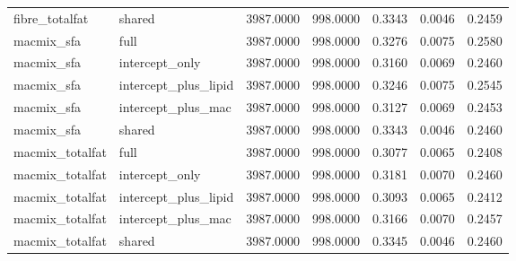 {\begin{longtable}{lllllll}
fibre\_totalfat & shared & 3987.0000 & 998.0000 & 0.3343 & 0.0046 & 0.2459 \\
macmix\_sfa & full & 3987.0000 & 998.0000 & 0.3276 & 0.0075 & 0.2580 \\
macmix\_sfa & intercept\_only & 3987.0000 & 998.0000 & 0.3160 & 0.0069 & 0.2460 \\
macmix\_sfa & intercept\_plus\_lipid & 3987.0000 & 998.0000 & 0.3246 & 0.0075 & 0.2545 \\
macmix\_sfa & intercept\_plus\_mac & 3987.0000 & 998.0000 & 0.3127 & 0.0069 & 0.2453 \\
macmix\_sfa & shared & 3987.0000 & 998.0000 & 0.3343 & 0.0046 & 0.2460 \\
macmix\_totalfat & full & 3987.0000 & 998.0000 & 0.3077 & 0.0065 & 0.2408 \\
macmix\_totalfat & intercept\_only & 3987.0000 & 998.0000 & 0.3181 & 0.0070 & 0.2460 \\
macmix\_totalfat & intercept\_plus\_lipid & 3987.0000 & 998.0000 & 0.3093 & 0.0065 & 0.2412 \\
macmix\_totalfat & intercept\_plus\_mac & 3987.0000 & 998.0000 & 0.3166 & 0.0070 & 0.2457 \\
macmix\_totalfat & shared & 3987.0000 & 998.0000 & 0.3345 & 0.0046 & 0.2460 \\
\bottomrule
\end{longtable}}
